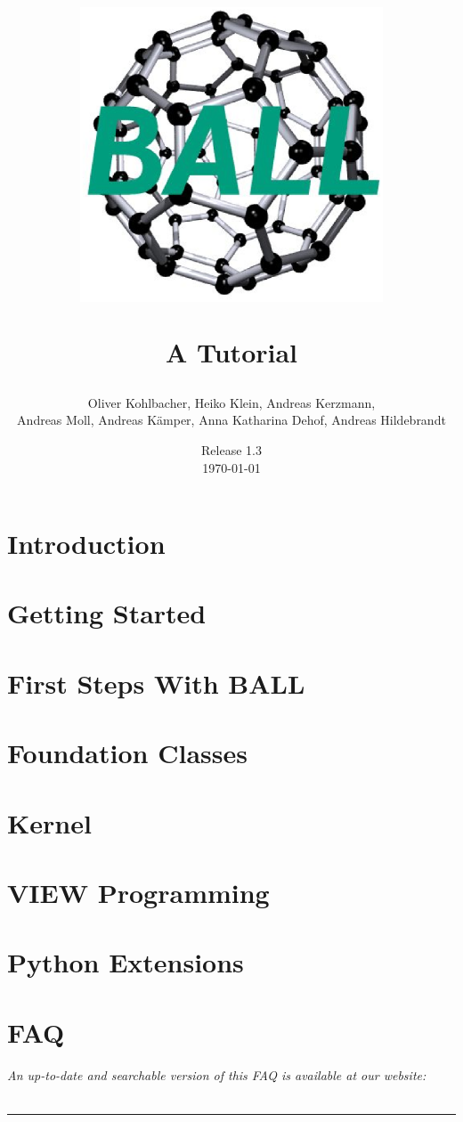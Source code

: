 \documentclass[12pt,twoside]{report}
\author{
  Oliver Kohlbacher, Heiko Klein, Andreas Kerzmann, \\
  Andreas Moll, Andreas K\"{a}mper, Anna Katharina Dehof, Andreas Hildebrandt
}
\title{
  \begin{center}
    \includegraphics[width=9cm]{logo.eps}
  \end{center}
  \vspace{1cm}
  \Large A Tutorial
}
\date{
  Release 1.3\\
  \today
}
\begin{document}
\setlength{\headheight}{14.5pt}
\setcounter{page}{1}
\maketitle
\cleardoublepage

\tableofcontents
\clearpage

\setcounter{page}{1}


\chapter{Introduction}
\label{chapter:introduction}



\chapter{Getting Started}
\label{chapter:getting-started}




\chapter{First Steps With BALL}
\label{chapter:first-steps}




\chapter{Foundation Classes}
\label{chapter:foundation-classes}




\chapter{Kernel}
\label{chapter:kernel}


\chapter{VIEW Programming}
\label{chapter:view-programming}


\chapter{Python Extensions}
\label{chapter:python}


\chapter{FAQ}
\label{chapter:faq}
\newpage
\noindent
{\it An up-to-date and searchable version of this FAQ is available at our 
website:\\
}\\
\hspace{1mm}
\rule{\textwidth}{0.1pt}
\hspace{3mm}

\end{document}
